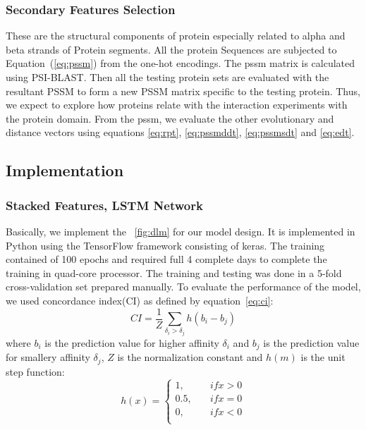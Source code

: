 \subsubsection{Secondary Features Selection}
These are the structural components of protein especially related to alpha and beta strands of Protein segments. All the protein Sequences are subjected to Equation~(\ref{eq:pssm}) from the one-hot encodings. The \acrshort{pssm} matrix is calculated using PSI-BLAST\cite{Schaffer2001}. Then all the testing protein sets are evaluated with the resultant PSSM to form a new PSSM matrix specific to the testing protein. Thus, we expect to explore how proteins relate with the interaction experiments with the protein domain. From the \acrshort{pssm}, we evaluate the other evolutionary and distance vectors using equations \ref{eq:rpt}, \ref{eq:pssmddt}, \ref{eq:pssmsdt} and \ref{eq:edt}.

\subsection{Implementation}

\subsubsection{Stacked Features, LSTM Network}
Basically, we implement the ~\ref{fig:dlm} for our model design. It is implemented in Python using the TensorFlow framework consisting of keras. The training contained of 100 epochs and required full 4 complete days to complete the training in quad-core processor. The training and testing was done in a 5-fold cross-validation set prepared manually. To evaluate the performance of the model, we used concordance index(CI)\cite{Xu2015} as defined by equation~\ref{eq:ci}:
\begin{equation}
    CI = \frac{1}{Z} \sum_{\delta_i > \delta_j} h(b_i - b_j)
    \label{eq:ci}
\end{equation}
where $b_i$ is the prediction value for higher affinity $\delta_i$ and $b_j$ is the prediction value for smallery affinity $\delta_j$, $Z$ is the normalization constant and $h(m)$ is the unit step function:
\begin{equation} h(x) = 
    \begin{cases}
        1,& \quad {if x>0} \\
        0.5, & \quad{ if x=0 } \\
        0, & \quad{if x<0} \\
    \end{cases}
\end{equation}

